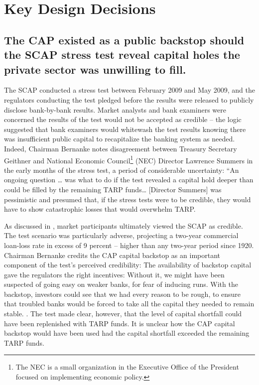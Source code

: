 \documentclass[12pt]{article}
\begin{document}
\newpage
\section{Key Design Decisions}

\subsection{The CAP existed as a public backstop should the SCAP stress test reveal capital holes the private sector was unwilling to fill.}

The SCAP conducted a stress test between February 2009 and May 2009, and the regulators conducting the test pledged before the results were released to publicly disclose bank-by-bank results. Market analysts and bank examiners were concerned the results of the test would not be accepted as credible -- the logic suggested that bank examiners would whitewash the test results knowing there was insufficient public capital to recapitalize the banking system as needed. Indeed, Chairman Bernanke notes disagreement between Treasury Secretary Geithner and National Economic Council\footnote{The NEC is a small organization in the Executive Office of the President focused on implementing economic policy.} (NEC) Director Lawrence Summers in the early months of the stress test, a period of considerable uncertainty: “An ongoing question … was what to do if the test revealed a capital hold deeper than could be filled by the remaining TARP funds… [Director Summers] was pessimistic and presumed that, if the stress tests were to be credible, they would have to show catastrophic losses that would overwhelm TARP.


As discussed in \citet{Ross2016a}, market participants ultimately viewed the SCAP as credible. The test scenario was particularly adverse, projecting a two-year commercial loan-loss rate in excess of 9 percent -- higher than any two-year period since 1920. Chairman Bernanke credits the CAP capital backstop as an important component of the test's perceived credibility:
The availability of backstop capital gave the regulators the right incentives: Without it, we might have been suspected of going easy on weaker banks, for fear of inducing runs. With the backstop, investors could see that we had every reason to be rough, to ensure that troubled banks would be forced to take all the capital they needed to remain stable. \citep{Bernanke}.
The test made clear, however, that the level of capital shortfall could have been replenished with TARP funds. It is unclear how the CAP capital backstop would have been used had the capital shortfall exceeded the remaining TARP funds.
\end{document}
